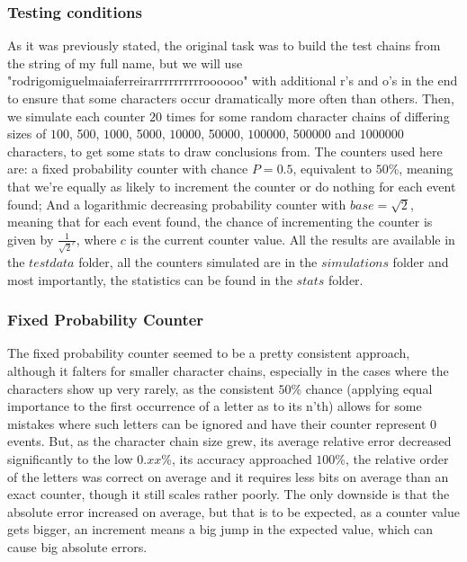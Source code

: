 \documentclass[...]{revdetua}
\begin{document}
\subsubsection{Testing conditions}
As it was previously stated, the original task was  to build the test chains from the string of my full name, but we will use "rodrigomiguelmaiaferreirarrrrrrrrrroooooo" with additional r's and o's in the end to ensure that some characters occur dramatically more often than others.
Then, we simulate each counter $20$ times for some random character chains of differing sizes of $100$, 500, $1000$, 5000, $10000$, 50000, $100000$, 500000 and $1000000$ characters, to get some stats to draw conclusions from.
The counters used here are: a fixed probability counter with chance $P=0.5$, equivalent to $50$\%, meaning that we're equally as likely to increment the counter or do nothing for each event found; And a logarithmic decreasing probability counter with $base=\sqrt{2}$, meaning that for each event found, the chance of incrementing the counter is given by $\frac{1}{\sqrt{2}^{c}}$, where $c$ is the current counter value.
All the results are available in the $testdata$ folder, all the counters simulated are in the $simulations$ folder and most importantly, the statistics can be found in the $stats$ folder.

\subsubsection{Fixed Probability Counter}

The fixed probability counter seemed to be a pretty consistent approach, although it falters for smaller character chains, especially in the cases where the characters show up very rarely, as the consistent $50$\% chance (applying equal importance to the first occurrence of a letter as to its n'th) allows for some mistakes where such letters can be ignored and have their counter represent 0 events.
But, as the character chain size grew, its average relative error decreased significantly to the low $0.xx$\%, its accuracy approached $100$\%, the relative order of the letters was correct on average and it requires less bits on average than an exact counter, though it still scales rather poorly. The only downside is that the absolute error increased on average, but that is to be expected, as a counter value gets bigger, an increment means a big jump in the expected value, which can cause big absolute errors.	
\end{document}
